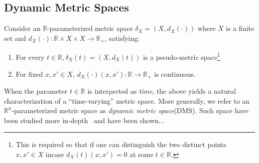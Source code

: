 \documentclass[10pt]{article}
\begin{document}
\subsection*{Dynamic Metric Spaces}
Consider an $\mathbb{R}$-parameterized metric space $\delta_X = ( X, d_X(\cdot) )$ where
$X$ is a finite set and $d_X(\cdot): \mathbb{R} \times X \times X \to \mathbb{R}_{+}$, satisfying: 
\begin{enumerate}
	\item For every $t \in \mathbb{R}, \delta_X(t) = (X, d_X(t))$ is a pseudo-metric space\footnote{This is required so that if one can distinguish the two distinct points $x, x' \in X$ incase $d_X(t)(x, x') = 0$ at some $t \in \mathbb{R}$. } 
	\item For fixed $x, x' \in X$, $d_X(\cdot)(x, x'): \mathbb{R} \to \mathbb{R}_{+}$ is continuous.
\end{enumerate}
When the parameter $t \in \mathbb{R}$ is interpreted as \emph{time}, the above yields a natural characterization of a ``time-varying'' metric space. More generally, we refer to an $\mathbb{R}^h$-parameterized metric space as \emph{dynamic metric space}(DMS). Such space have been studied more in-depth~\cite{} and have been shown...
 
\end{document}

